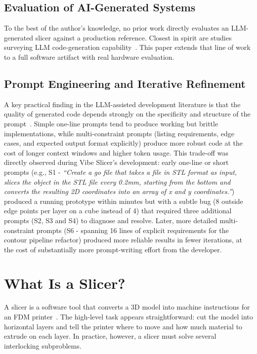 \documentclass[10pt,twocolumn,a4paper]{article}
\begin{document}
\subsection{Evaluation of AI-Generated Systems}

To the best of the author's knowledge, no prior work directly
evaluates an LLM-generated slicer against a production reference.
Closest in spirit are studies surveying LLM code-generation capability~\cite{jiang2023survey}.
This paper extends that line of work to a full software artifact
with real hardware evaluation.

\subsection{Prompt Engineering and Iterative Refinement}

A key practical finding in the LLM-assisted development literature
is that the quality of generated code depends strongly on the
specificity and structure of the prompt~\cite{ziegler2022productivity}.
Simple one-line prompts tend to produce working but brittle
implementations, while multi-constraint prompts
(listing requirements, edge cases, and expected output format
explicitly) produce more robust code at the cost of longer
context windows and higher token usage.
This trade-off was directly observed during Vibe Slicer's
development: early one-line or short prompts (e.g., S1 - \emph{``Create a go file that takes a file in STL format as input, slices the object in the STL file every 0.2mm, starting from the bottom and converts the resulting 2D coordinates into an array of x and y
coordinates.''}) produced a running prototype within minutes
but with a subtle bug (8 outside edge points per layer on a cube instead of 4)
that required three additional prompts (S2, S3 and S4) to diagnose and resolve.
Later, more detailed multi-constraint prompts (S6 - spanning 16 lines
of explicit requirements for the contour pipeline refactor)
produced more reliable results in fewer iterations, at the cost
of substantially more prompt-writing effort from the developer.

\section{What Is a Slicer?}
\label{sec:slicer}

A slicer is a software tool that converts a 3D model into machine
instructions for an FDM printer~\cite{gibson2021additive}.
The high-level task appears straightforward: cut the model into
horizontal layers and tell the printer where to move and how much
material to extrude on each layer.
In practice, however, a slicer must solve several interlocking
subproblems.
\end{document}
